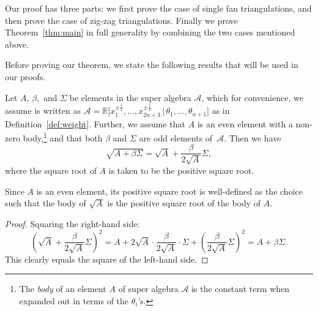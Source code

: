 Our proof has three parts: we first prove the case of single fan triangulations, and then prove the case of zig-zag triangulations. Finally we prove Theorem~\ref{thm:main} in full generality by combining the two cases mentioned above.

Before proving our theorem, we state the following results that will be used in our proofs.

\begin{Proposition} \label{lemma:theta32}
 Let $A$, $\beta,$ and $\Sigma$ be elements in the super algebra $\mathcal A$, which for convenience, we assume is written as
 $\mathcal A = {\mathbb R}\bigl[x_1^{\pm\frac{1}{2}},\dots,x_{2n+3}^{\pm\frac{1}{2}} \,|\, \theta_1,\dots,\theta_{n+1}\bigr]$ as in Definition~{\rm \ref{def:weight}}.
 Further, we assume that $A$ is an even element with a non-zero body,\footnote{The \emph{body} of an element $A$ of super algebra $\mathcal A$ is the constant term when expanded out in terms of the $\theta_i$'s.}
 and that both $\beta$ and $\Sigma$ are odd elements of~$\mathcal A$. Then we have
 \[\sqrt{A+\beta\Sigma}= \sqrt{A}+\frac{\beta}{2\sqrt{A}}\Sigma,\]
 where the square root of $A$ is taken to be the positive square root.
\end{Proposition}

\begin{Remark}\rm
 Since $A$ is an even element, its positive square root is well-defined as the choice such that the body of $\sqrt{A}$ is the positive square root of the body of $A$.
\end{Remark}

\begin{proof}
 Squaring the right-hand side:
 \[\left(\sqrt{A}+\frac{\beta}{2\sqrt{A}}\Sigma\right)^2=A+2\sqrt{A}\cdot \frac{\beta}{2\sqrt{A}}\cdot \Sigma +\left(\frac{\beta}{2\sqrt{A}}\Sigma\right)^2=A+\beta\Sigma.\]
 This clearly equals the square of the left-hand side.
\end{proof}

